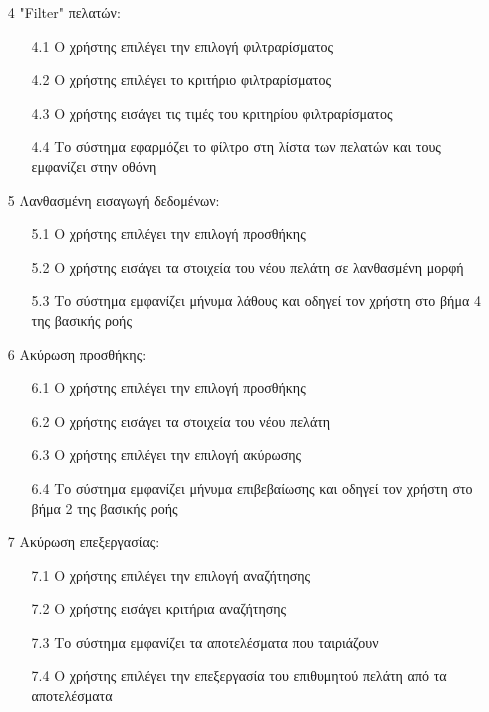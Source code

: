 \documentclass[12pt,a4paper,twoside]{book}
\begin{document}
\begin{enumerate}
  \item[4 ] "Filter" πελατών: %
        \begin{enumerate}
          \item [4.1 ] Ο χρήστης επιλέγει την επιλογή φιλτραρίσματος
          \item [4.2 ] Ο χρήστης επιλέγει το κριτήριο φιλτραρίσματος %
          \item [4.3 ] Ο χρήστης εισάγει τις τιμές του κριτηρίου φιλτραρίσματος
          \item [4.4 ] Το σύστημα εφαρμόζει το φίλτρο στη λίστα των πελατών και τους εμφανίζει στην οθόνη
        \end{enumerate}
  \item[5 ] Λανθασμένη εισαγωγή δεδομένων:
        \begin{enumerate}
          \item [5.1 ] Ο χρήστης επιλέγει την επιλογή προσθήκης
          \item [5.2 ] Ο χρήστης εισάγει τα στοιχεία του νέου πελάτη σε λανθασμένη μορφή
          \item [5.3 ] Το σύστημα εμφανίζει μήνυμα λάθους και οδηγεί τον χρήστη στο βήμα 4 της βασικής ροής
        \end{enumerate}
  \item[6 ] Ακύρωση προσθήκης:
        \begin{enumerate}
          \item [6.1 ] Ο χρήστης επιλέγει την επιλογή προσθήκης
          \item [6.2 ] Ο χρήστης εισάγει τα στοιχεία του νέου πελάτη
          \item [6.3 ] Ο χρήστης επιλέγει την επιλογή ακύρωσης
          \item [6.4 ] Το σύστημα εμφανίζει μήνυμα επιβεβαίωσης και οδηγεί τον χρήστη στο βήμα 2 της βασικής ροής
        \end{enumerate}
  \item[7 ] Ακύρωση επεξεργασίας:
        \begin{enumerate}
          \item [7.1 ] Ο χρήστης επιλέγει την επιλογή αναζήτησης
          \item [7.2 ] Ο χρήστης εισάγει κριτήρια αναζήτησης %
          \item [7.3 ] Το σύστημα εμφανίζει τα αποτελέσματα που ταιριάζουν
          \item [7.4 ] Ο χρήστης επιλέγει την επεξεργασία του επιθυμητού πελάτη από τα αποτελέσματα

\end{enumerate}
\end{enumerate}
\end{document}
